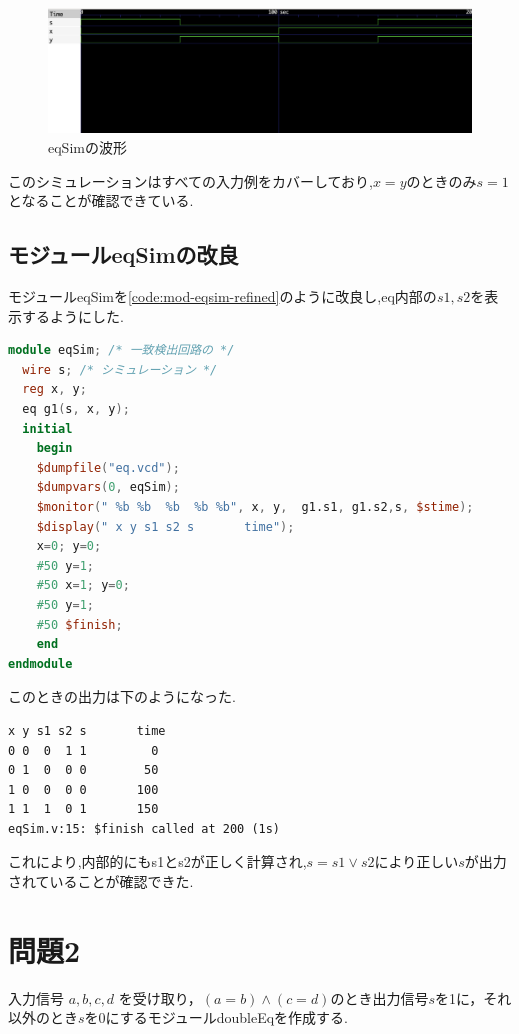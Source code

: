 \documentclass[autodetect-engine, dvi=dvipdfmx, 10pt, a4paper, ja=standard]{bxjsarticle}
\begin{document}
\begin{figure}[H]
	\centering
	\includegraphics[width=\textwidth]{ex1.png}
	\caption{eqSimの波形}
	\label{fig:ex1}
\end{figure}

このシミュレーションはすべての入力例をカバーしており,$x=y$のときのみ$s=1$となることが確認できている.

\subsection{モジュールeqSimの改良}

モジュールeqSimを\ref{code:mod-eqsim-refined}のように改良し,eq内部の$s1, s2$を表示するようにした.

\begin{lstlisting}[language={Verilog}, caption={改良後のモジュールeqSimのVerilogコード}, label={code:mod-eqsim-refined}]
module eqSim; /* 一致検出回路の */
  wire s; /* シミュレーション */
  reg x, y;
  eq g1(s, x, y);
  initial
    begin
    $dumpfile("eq.vcd");
    $dumpvars(0, eqSim);
    $monitor(" %b %b  %b  %b %b", x, y,  g1.s1, g1.s2,s, $stime);
    $display(" x y s1 s2 s       time");
    x=0; y=0;
    #50 y=1;
    #50 x=1; y=0;
    #50 y=1;
    #50 $finish;
    end
endmodule
\end{lstlisting}

このときの出力は下のようになった.

\begin{verbatim}
x y s1 s2 s       time
0 0  0  1 1         0
0 1  0  0 0        50
1 0  0  0 0       100
1 1  1  0 1       150
eqSim.v:15: $finish called at 200 (1s)
\end{verbatim}

これにより,内部的にもs1とs2が正しく計算され,$s = s1 \lor s2$により正しい$s$が出力されていることが確認できた.

\section{問題2}
\label{sec:ex-2}

入力信号 $a, b, c, d$ を受け取り，$(a = b) \land (c = d)$のとき出力信号$s$を1に，それ以外のとき$s$を0にするモジュールdoubleEqを作成する.
\end{document}

